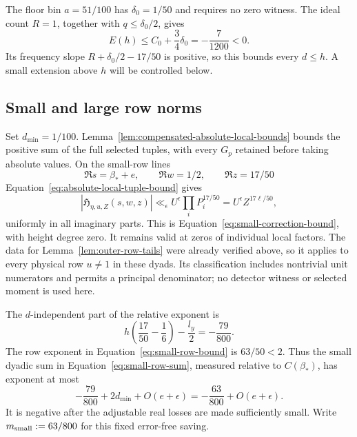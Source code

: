 \documentclass[11pt,a4paper]{article}
\numberwithin{equation}{section}
\numberwithin{figure}{section}
\theoremstyle{definition}
\theoremstyle{remark}
\begin{document}
The floor bin \(a=51/100\) has \(\delta_0=1/50\) and requires no
zero witness.  The ideal count \(R=1\), together with
\(q\le\delta_0/2\), gives
\begin{equation}\label{eq:floor-bound}
 E(h)\le C_0+\frac34\delta_0=-\frac7{1200}<0.
\end{equation}
Its frequency slope \(R+\delta_0/2-17/50\) is positive, so this
bounds every \(d\le h\).  A small extension above \(h\) will be
controlled below.

\subsection{Small and large row norms}\label{sec:tails}

Set \(d_{\min}=1/100\).  Lemma~\ref{lem:compensated-absolute-local-bounds}
bounds the positive sum of the full selected tuples, with every \(G_p\)
retained before taking absolute values.  On the small-row lines
\[
 \Re s=\beta_*+e,\qquad \Re w=1/2,\qquad \Re z=17/50
\]
Equation~\eqref{eq:absolute-local-tuple-bound} gives
\[
 |\mathfrak H_{\eta,u,Z}(s,w,z)|
 \ll_\epsilon U^\epsilon\prod_iP_i^{17/50}
 =U^\epsilon Z^{17\ell/50},
\]
uniformly in all imaginary parts.  This is
Equation~\eqref{eq:small-correction-bound}, with height degree zero.
It remains valid at zeros of individual local factors.  The data for
Lemma~\ref{lem:outer-row-tails} were already verified above, so it
applies to every physical row \(u\ne1\) in these dyads.  Its
classification includes nontrivial unit numerators and permits a principal
denominator; no detector witness or selected moment is used here.

The \(d\)-independent part of the relative exponent is
\begin{equation}\label{eq:small-frequency-margin}
 h\left(\frac{17}{50}-\frac16\right)-\frac{l_y}{2}
 =-\frac{79}{800}.
\end{equation}
The row exponent in Equation~\eqref{eq:small-row-bound} is
\(63/50<2\).  Thus the small dyadic sum in
Equation~\eqref{eq:small-row-sum}, measured relative to \(C(\beta_*)\),
has exponent at most
\[
 -\frac{79}{800}+2d_{\min}+O(e+\epsilon)
 =-\frac{63}{800}+O(e+\epsilon).
\]
It is negative after the adjustable real losses are made sufficiently
small.  Write \(m_{\rm small}:=63/800\) for this fixed error-free saving.
\end{document}
